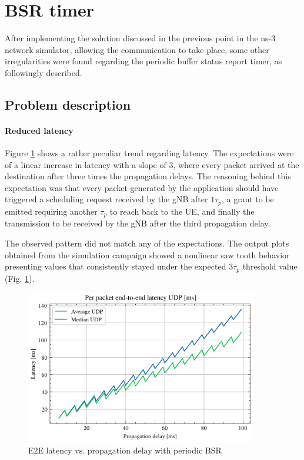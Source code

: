\section{BSR timer}

After implementing the solution discussed in the previous point in the ns-3 network simulator, allowing the communication to take place, some other irregularities were found regarding the periodic buffer status report timer, as followingly described. 

\subsection{Problem description}

\paragraph{Reduced latency}

Figure \ref{fig:lat-saw} shows a rather peculiar trend regarding latency. The expectations were of a linear increase in latency with a slope of 3, where every packet arrived at the destination after three times the propagation delays. The reasoning behind this expectation was that every packet generated by the application should have triggered a scheduling request received by the \ac{gNB} after $1\tau_p$, a grant to be emitted requiring another $\tau_p$ to reach back to the \ac{UE}, and finally the transmission to be received by the \ac{gNB} after the third propagation delay.

The observed pattern did not match any of the expectations. The output plots obtained from the simulation campaign showed a nonlinear saw tooth behavior presenting values that consistently stayed under the expected $3\tau_p$ threshold value (Fig. \ref{fig:lat-saw}).

\begin{figure}[ht]
    \centering
    \includegraphics[width=0.9\textwidth]{res/lat-udp-saw.png}
    \caption{E2E latency vs. propagation delay with periodic \ac{BSR}}
    \label{fig:lat-saw}
\end{figure}

